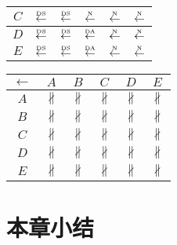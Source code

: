 \begin{table}[htbp]
\begin{subtable}{1\textwidth}
\begin{minipage}[b]{0.3\textwidth}
\begin{tabular}{|c|c|c|c|c|c|}
        $C$ & $\overset{\text{\tiny{DS}}}{\leftarrow}$ & $\overset{\text{\tiny{DS}}}{\leftarrow}$ & $\overset{\text{\tiny{N}}}{\leftarrow}$ & $\overset{\text{\tiny{N}}}{\leftarrow}$ & $\overset{\text{\tiny{N}}}{\leftarrow}$\\ \hline
        $D$ & $\overset{\text{\tiny{DS}}}{\leftarrow}$ & $\overset{\text{\tiny{DS}}}{\leftarrow}$ & $\overset{\text{\tiny{DA}}}{\leftarrow}$ & $\overset{\text{\tiny{N}}}{\leftarrow}$ & $\overset{\text{\tiny{N}}}{\leftarrow}$\\ \hline
        $E$ & $\overset{\text{\tiny{DS}}}{\leftarrow}$ & $\overset{\text{\tiny{DS}}}{\leftarrow}$ & $\overset{\text{\tiny{DA}}}{\leftarrow}$ & $\overset{\text{\tiny{N}}}{\leftarrow}$ & $\overset{\text{\tiny{N}}}{\leftarrow}$\\ \hline
      \end{tabular}
    \end{minipage}
    \begin{minipage}[b]{0.3\textwidth}
      \centering
      \begin{tabular}{|c|c|c|c|c|c|} \hline
        $\leftarrow$ & $A$ & $B$ & $C$ & $D$ & $E$\\ \hline
        $A$ & $\nparallel$ & $\nparallel$ & $\nparallel$ & $\nparallel$ & $\nparallel$\\ \hline
        $B$ & $\nparallel$ & $\nparallel$ & $\nparallel$ & $\nparallel$ & $\nparallel$\\ \hline
        $C$ & $\nparallel$ & $\nparallel$ & $\nparallel$ & $\nparallel$ & $\nparallel$\\ \hline
        $D$ & $\nparallel$ & $\nparallel$ & $\nparallel$ & $\nparallel$ & $\nparallel$\\ \hline
        $E$ & $\nparallel$ & $\nparallel$ & $\nparallel$ & $\nparallel$ & $\nparallel$\\ \hline
      \end{tabular}
    \end{minipage}
  \end{subtable}
\end{table}

\section{本章小结}